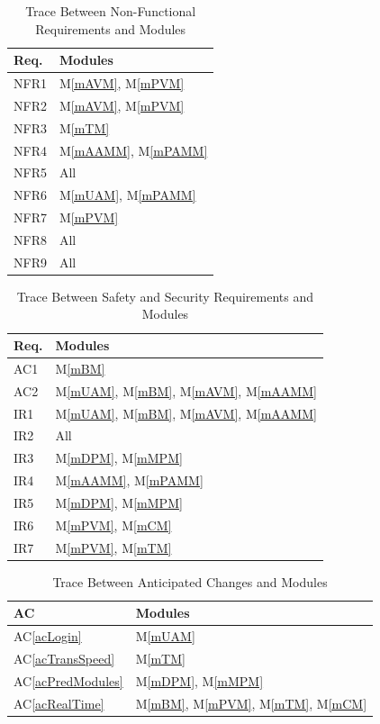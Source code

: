 \documentclass[12pt, titlepage]{article}
\newcommand{\acref}[1]{AC\ref{#1}}
\newcommand{\mref}[1]{M\ref{#1}}
\begin{document}
\begin{table}[H]
\centering
\begin{tabular}{p{} p{}}
\toprule
\textbf{Req.} & \textbf{Modules}\\
\midrule
NFR1 & \mref{mAVM}, \mref{mPVM}\\
NFR2 & \mref{mAVM}, \mref{mPVM}\\
NFR3 & \mref{mTM}\\
NFR4 & \mref{mAAMM}, \mref{mPAMM}\\
NFR5 & All \\
NFR6 & \mref{mUAM}, \mref{mPAMM}\\
NFR7 & \mref{mPVM}\\
NFR8 & All \\
NFR9 & All \\
\bottomrule
\end{tabular}
\caption{Trace Between Non-Functional Requirements and Modules}
\label{TblRT}
\end{table}


\begin{table}[H]
\centering
\begin{tabular}{p{} p{}}
\toprule
\textbf{Req.} & \textbf{Modules}\\
\midrule
AC1 & \mref{mBM}\\
AC2 & \mref{mUAM}, \mref{mBM}, \mref{mAVM}, \mref{mAAMM}\\
IR1 & \mref{mUAM}, \mref{mBM}, \mref{mAVM}, \mref{mAAMM}\\
IR2 & All \\
IR3 & \mref{mDPM}, \mref{mMPM}\\
IR4 & \mref{mAAMM}, \mref{mPAMM}\\
IR5 & \mref{mDPM}, \mref{mMPM}\\
IR6 & \mref{mPVM}, \mref{mCM}\\
IR7 & \mref{mPVM}, \mref{mTM}\\
\bottomrule
\end{tabular}
\caption{Trace Between Safety and Security Requirements and Modules}
\label{TblRT}
\end{table}

\begin{table}[H]
\centering
\begin{tabular}{p{} p{}}
\toprule
\textbf{AC} & \textbf{Modules}\\
\midrule
\acref{acLogin} & \mref{mUAM}\\
\acref{acTransSpeed} & \mref{mTM}\\
\acref{acPredModules} & \mref{mDPM}, \mref{mMPM}\\
\acref{acRealTime} & \mref{mBM}, \mref{mPVM}, \mref{mTM}, \mref{mCM}\\
\bottomrule
\end{tabular}
\caption{Trace Between Anticipated Changes and Modules}
\label{TblACT}
\end{table}
\end{document}
